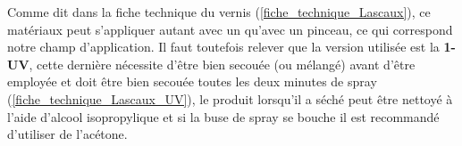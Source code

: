 Comme dit dans la fiche technique du vernis (\ref{fiche_technique_Lascaux}), ce matériaux peut s'appliquer autant avec un  qu'avec
un pinceau, ce qui correspond notre champ d'application. Il faut toutefois relever que la version utilisée est la \textbf{1-UV}, cette dernière nécessite d'être
bien secouée (ou mélangé) avant d'être employée et doit être bien secouée toutes les deux minutes de spray (\ref{fiche_technique_Lascaux_UV}), le produit lorsqu'il a séché
peut être nettoyé à l'aide d'alcool isopropylique et si la buse de spray se bouche il est recommandé d'utiliser de l'acétone.

\begin{table}[H]
    \centering
    \caption{Table des avantages et inconvénients du vernis Lascaux}
    \label{tab:lascaux_UV}
\end{table}